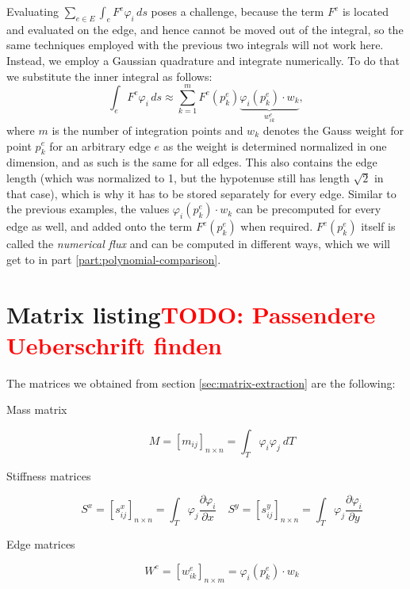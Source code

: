\documentclass{article}
\newcommand{\todo}[2][]{\textcolor{red}{TODO\ifthenelse{\equal{#1}{}}{}{[#1]}: #2}}
\newcommand{\pd}[2]{\dfrac{\partial #1}{\partial #2}}
\renewcommand{\phi}{\varphi}
\begin{document}
Evaluating $\sum_{e \in E} \int_{e} F^e \phi_i \, ds$ poses a challenge, because the term $F^e$ is located and evaluated on the edge, and hence cannot be moved out of the integral, so the same techniques employed with the previous two integrals will not work here. Instead, we employ a Gaussian quadrature and integrate numerically. To do that we substitute the inner integral as follows:
\begin{equation}
  \int_{e} F^e \phi_i \, ds \approx \sum_{k=1}^{m} F^e\left(p_k^e\right) \underbrace{\phi_i\left(p_k^e\right) \cdot w_k}_{w_{ik}^e},
\end{equation}
where $m$ is the number of integration points and $w_k$ denotes the Gauss weight for point $p_k^e$ for an arbitrary edge $e$ as the weight is determined normalized in one dimension, and as such is the same for all edges. This also contains the edge length (which was normalized to 1, but the hypotenuse still has length $\sqrt{2}$ in that case), which is why it has to be stored separately for every edge. Similar to the previous examples, the values $\phi_i\left(p_k^e\right) \cdot w_k$ can be precomputed for every edge as well, and added onto the term $F^e\left(p_k^e\right)$ when required. $F^e\left(p_k^e\right)$ itself is called the \emph{numerical flux} and can be computed in different ways, which we will get to in part \ref{part:polynomial-comparison}.

\section{Matrix listing\todo{Passendere Ueberschrift finden}}
\label{sec:matrix-listing}

The matrices we obtained from section \ref{sec:matrix-extraction} are the following:

\begin{description}
\item[Mass matrix]
  \begin{equation}
    \label{eq:mass-matrix}
    M = [m_{ij}]_{n \times n} = \int_T \phi_i \phi_j \ dT
  \end{equation}
\item[Stiffness matrices]
  \begin{equation}
    \label{eq:stiffness-matrix}
    S^x = [s_{ij}^x]_{n \times n} = \int_T \phi_j \pd{\phi_i}{x} \quad
    S^y = [s_{ij}^y]_{n \times n} = \int_T \phi_j \pd{\phi_i}{y}
  \end{equation}
\item[Edge matrices]
  \begin{equation}
    \label{eq:edge-matrix}
    W^e = [w_{ik}^e]_{n \times m} = \phi_i(p_k^e) \cdot w_k
  \end{equation}
\end{description}
\end{document}
